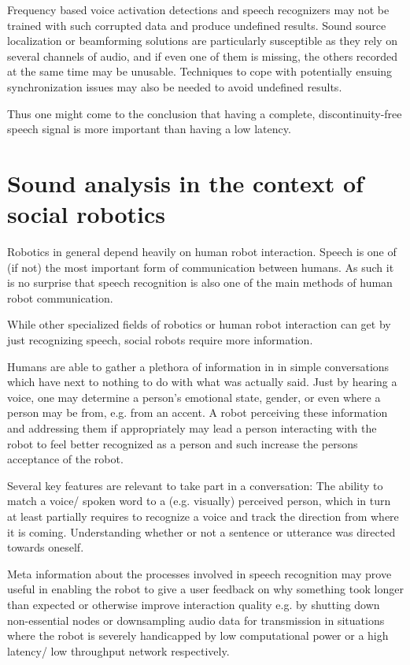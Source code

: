 Frequency based voice activation detections and speech recognizers may not be trained with such corrupted data and produce undefined results.
Sound source localization or beamforming solutions are particularly susceptible as they rely on several channels of audio, and if even one of them is missing, the others recorded at the same time may be unusable.
Techniques to cope with potentially ensuing synchronization issues may also be needed to avoid undefined results.
	
Thus one might come to the conclusion that having a complete, discontinuity-free speech signal is more important than having a low latency.

\section{Sound analysis in the context of social robotics}
Robotics in general depend heavily on human robot interaction. Speech is one of (if not) the most important form of communication between humans. 
As such it is no surprise that speech recognition is also one of the main methods of human robot communication.

While other specialized fields of robotics or human robot interaction can get by just recognizing speech, social robots require more information.

Humans are able to gather a plethora of information in in simple conversations which have next to nothing to do with what was actually said. 
Just by hearing a voice, one may determine a person’s emotional state, gender, or even where a person may be from, e.g. from an accent. 
A robot perceiving these information and addressing them if appropriately may lead a person interacting with the robot to feel better recognized as a person and such increase the persons acceptance of the robot.

Several key features are relevant to take part in a conversation: 
The ability to match a voice/ spoken word to a (e.g. visually) perceived person, which in turn at least partially requires to recognize a voice and track the direction from where it is coming. 
Understanding whether or not a sentence or utterance was directed towards oneself.

Meta information about the processes involved in speech recognition may prove useful in enabling the robot to give a user feedback on why something took longer than expected or otherwise improve interaction quality e.g. by shutting down non-essential nodes or downsampling audio data for transmission in situations where the robot is severely handicapped by low computational power or a high latency/ low throughput network respectively.

